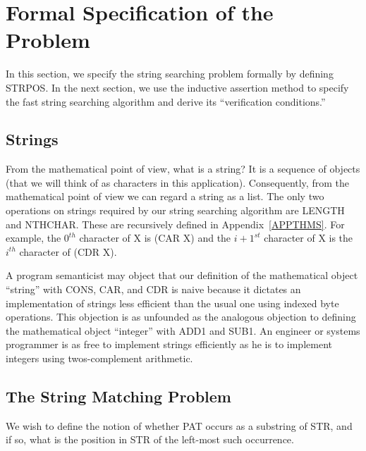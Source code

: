 \documentclass[11pt]{book}
\newcommand{\pubdefaulttextsize}{\large}
\begin{document}
\section{Formal Specification of the Problem}
\pubdefaulttextsize
In this section, we specify the string searching problem formally
by defining STRPOS.
In the next section, we use the inductive assertion method to specify the
fast string searching algorithm and derive its ``verification
conditions.''
\subsection{Strings}
\pubdefaulttextsize
From the mathematical point of view, what is a string?  It is
a sequence of objects (that we will think of as characters in this
application).  Consequently, from the mathematical point of view we can
regard a string as a list.
The only two operations on strings required by
our string searching algorithm are LENGTH and NTHCHAR.  These are
recursively defined in Appendix~\ref{APPTHMS}.  For example, the $0^{th}$
character of X is (CAR X) and the $i+1^{st}$ character of X is
the $i^{th}$ character of (CDR X).

A program semanticist may object that our definition
of the mathematical object ``string'' with CONS, CAR, and CDR is
naive because it dictates an implementation of strings less
efficient than the usual one using indexed byte operations.
This objection is as unfounded as the analogous objection to defining
the mathematical object ``integer'' with ADD1 and SUB1.  An engineer
or systems programmer is as free to implement strings efficiently
as he is to implement integers using twos-complement arithmetic.
\subsection{The String Matching Problem}
\pubdefaulttextsize
We wish to define the notion of whether PAT occurs as a substring of STR,
and if so, what is the position in STR of the left-most such occurrence.
\end{document}
